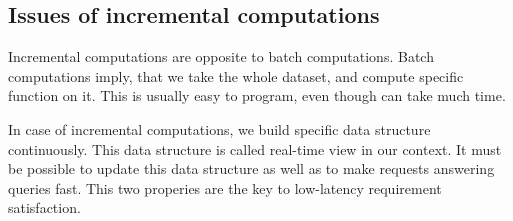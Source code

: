 \subsection{Issues of incremental computations}
Incremental computations are opposite to batch computations.
Batch computations imply, that we take the whole dataset, and compute
specific function on it.
This is usually easy to program, even though can take much time.

In case of incremental computations, we build specific data structure
continuously.
This data structure is called real-time view in our context.
It must be possible to update this data structure as well as to make requests
answering queries fast.
This two properies are the key to low-latency requirement satisfaction.